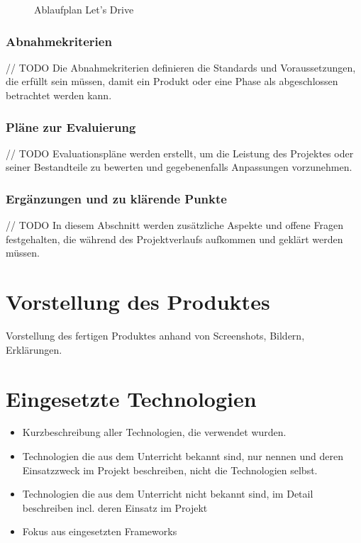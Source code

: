 \begin{figure}[H]
	\centering
	\caption{Ablaufplan Let's Drive}
	\label{fig:ablaufplan}
\end{figure}

\subsection{Abnahmekriterien}
// TODO
Die Abnahmekriterien definieren die Standards und Voraussetzungen, die erfüllt sein müssen, damit ein Produkt oder eine Phase als abgeschlossen betrachtet werden kann.

\subsection{Pläne zur Evaluierung}
// TODO
Evaluationspläne werden erstellt, um die Leistung des Projektes oder seiner Bestandteile zu bewerten und gegebenenfalls Anpassungen vorzunehmen.

\subsection{Ergänzungen und zu klärende Punkte}
// TODO
In diesem Abschnitt werden zusätzliche Aspekte und offene Fragen festgehalten, die während des Projektverlaufs aufkommen und geklärt werden müssen.

\chapter{Vorstellung des Produktes}
Vorstellung des fertigen Produktes anhand von Screenshots, Bildern, Erklärungen.

\chapter{Eingesetzte Technologien}
\begin{itemize}
	\item Kurzbeschreibung aller Technologien, die verwendet wurden.
	\item Technologien die aus dem Unterricht bekannt sind, nur nennen und deren  Einsatzzweck im Projekt beschreiben, nicht die Technologien selbst.
	\item Technologien die aus dem Unterricht nicht bekannt sind, im Detail beschreiben incl. deren Einsatz im Projekt
	\item Fokus aus eingesetzten Frameworks
\end{itemize}

